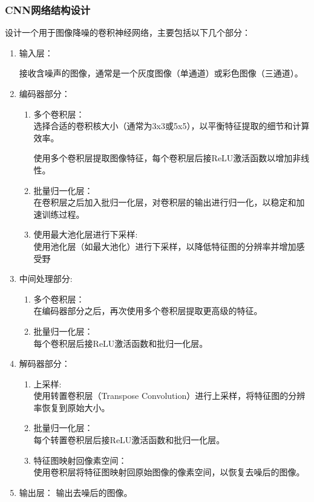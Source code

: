 \documentclass{lzureport}
\begin{document}
\subsubsection{CNN网络结构设计}
设计一个用于图像降噪的卷积神经网络，主要包括以下几个部分：
\begin{enumerate}[label=\arabic*)]
	\item 输入层：

	接收含噪声的图像，通常是一个灰度图像（单通道）或彩色图像（三通道）。

	\item 编码器部分：
	\begin{enumerate}[itemindent=1em,label=(\arabic*)]
		\item 多个卷积层：\\
		选择合适的卷积核大小（通常为3x3或5x5），以平衡特征提取的细节和计算效率。

		使用多个卷积层提取图像特征，每个卷积层后接ReLU激活函数以增加非线性。

		\item 批量归一化层：\\
		在卷积层之后加入批归一化层，对卷积层的输出进行归一化，以稳定和加速训练过程。

		\item 使用最大池化层进行下采样:\\
		使用池化层（如最大池化）进行下采样，以降低特征图的分辨率并增加感受野
	\end{enumerate}

	\item 中间处理部分:
	\begin{enumerate}[itemindent=1em,label=(\arabic*)]
		\item 多个卷积层：\\
		在编码器部分之后，再次使用多个卷积层提取更高级的特征。

		\item 批量归一化层：\\
		每个卷积层后接ReLU激活函数和批归一化层。
	\end{enumerate}

	\item 解码器部分：
	\begin{enumerate}[itemindent=1em,label=(\arabic*)]
		\item 上采样:\\
		使用转置卷积层（Transpose Convolution）进行上采样，将特征图的分辨率恢复到原始大小。

		\item 批量归一化层：\\
		每个转置卷积层后接ReLU激活函数和批归一化层。

		\item 特征图映射回像素空间：\\
		使用卷积层将特征图映射回原始图像的像素空间，以恢复去噪后的图像。
	\end{enumerate}
	
	\item 输出层：
	输出去噪后的图像。
\end{enumerate}
\end{document}
